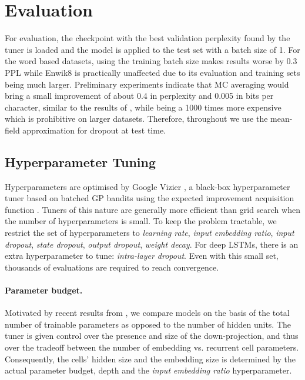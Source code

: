\documentclass[letter]{article} \usepackage{iclr2018_conference,times}
\newcommand{\enwik}{Enwik8\xspace}
\begin{document}
\section{Evaluation}

For evaluation, the checkpoint with the best validation perplexity
found by the tuner is loaded and the model is applied to the test set
with a batch size of 1. For the word based datasets, using the
training batch size makes results worse by 0.3 PPL while \enwik is
practically unaffected due to its evaluation and training sets being
much larger. Preliminary experiments indicate that MC averaging would
bring a small improvement of about 0.4 in perplexity and 0.005 in bits
per character, similar to the results of \citet{gal2016theoretically},
while being a 1000 times more expensive which is prohibitive on larger
datasets. Therefore, throughout we use the mean-field approximation
for dropout at test time.

\subsection{Hyperparameter Tuning}

Hyperparameters are optimised by Google Vizier
\citep{golovin2017google}, a black-box hyperparameter tuner based on
batched GP bandits using the expected improvement acquisition function
\citep{JMLR:v15:desautels14a}. Tuners of this nature are generally
more efficient than grid search when the number of hyperparameters is
small. To keep the problem tractable, we restrict the set of
hyperparameters to \textit{learning rate}, \textit{input embedding
  ratio}, \textit{input dropout}, \textit{state dropout},
\textit{output dropout}, \textit{weight decay}. For deep LSTMs, there
is an extra hyperparameter to tune: \textit{intra-layer dropout}. Even
with this small set, thousands of evaluations are required to reach
convergence.

\paragraph{Parameter budget.} Motivated by recent results from
\citet{collins2016capacity}, we compare models on the basis of the
total number of trainable parameters as opposed to the number of
hidden units. The tuner is given control over the presence and size of
the down-projection, and thus over the tradeoff between the number of
embedding vs. recurrent cell parameters. Consequently, the cells'
hidden size and the embedding size is determined by the actual
parameter budget, depth and the \textit{input embedding ratio}
hyperparameter.
\end{document}
